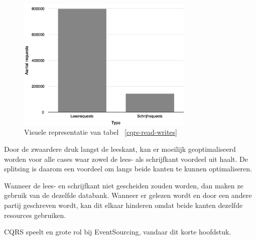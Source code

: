 \begin{figure}[h]
\caption{Visuele representatie van tabel ~\ref{cqrs-read-writes}}
\centering
\includegraphics[width=0.75\textwidth]{img/lees-en-schrijfkant}
\end{figure}

Door de zwaardere druk langst de leeskant, kan er moeilijk geoptimaliseerd worden voor alle cases waar zowel de lees- als schrijfkant voordeel uit haalt. De splitsing is daarom een voordeel om langs beide kanten te kunnen optimaliseren.

Wanneer de lees- en schrijfkant niet gescheiden zouden worden, dan maken ze gebruik van de dezelfde databank. Wanneer er gelezen wordt en door een andere partij geschreven wordt, kan dit elkaar hinderen omdat beide kanten dezelfde resources gebruiken.

CQRS speelt en grote rol bij EventSourcing, vandaar dit korte hoofdstuk.
